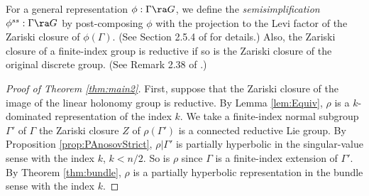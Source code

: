 For a general representation $\phi: \Gamma \ra G$, we define the {\em semisimplification} 
$\phi^{ss}: \Gamma \ra G$ by post-composing $\phi$ with the projection to 
the Levi factor of the Zariski closure of $\phi(\Gamma)$.  
(See Section 2.5.4 of \cite{GGKW17ii} for details.)
Also, the Zariski closure of a finite-index group is reductive if so is the Zariski closure of the original discrete group.
(See Remark 2.38 of \cite{GGKW17ii}.) 


	
	\begin{proof}[Proof of Theorem  \ref{thm:main2}] 
	
		First, suppose that the Zariski closure of the image of the linear holonomy group is 
	reductive. 
	By Lemma \ref{lem:Equiv}, $\rho$ is a $k$-dominated
	representation of the index $k$. 
We take a finite-index normal subgroup $\Gamma'$ of $\Gamma$ 
 the Zariski closure $Z$ of $\rho(\Gamma')$ is a connected 
	reductive Lie group. 	 
	By Proposition \ref{prop:PAnosovStrict}, $\rho|\Gamma'$ is 
	partially hyperbolic in the singular-value sense with the index $k$, $k < n/2$.
   So is $\rho$ since $\Gamma$ is a finite-index extension of $\Gamma'$. 
	By Theorem \ref{thm:bundle}, $\rho$ is a partially hyperbolic 
	representation in the bundle sense with the index $k$.

	
	

\end{proof}
